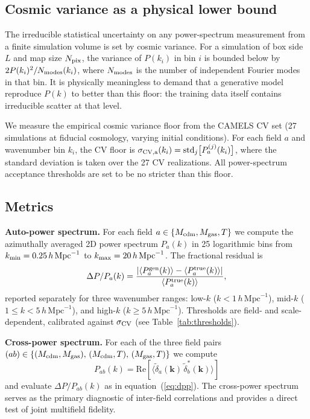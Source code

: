 \documentclass[usenatbib]{mnras}
\newcommand{\Mcdm}{M_{\rm cdm}}
\newcommand{\Mgas}{M_{\rm gas}}
\newcommand{\Tgas}{T}
\newcommand{\DeltaP}{\Delta P/P}
\begin{document}
\subsection{Cosmic variance as a physical lower bound}
\label{sec:cv_floor}

The irreducible statistical uncertainty on any power-spectrum
measurement from a finite simulation volume is set by cosmic variance.
For a simulation of box side $L$ and map size $N_{\rm pix}$, the
variance of $P(k_i)$ in bin $i$ is bounded below by
$2 P(k_i)^2 / N_{\rm modes}(k_i)$, where $N_{\rm modes}$ is the number
of independent Fourier modes in that bin.
It is physically meaningless to demand that a generative model reproduce
$P(k)$ to better than this floor: the training data itself contains
irreducible scatter at that level.

We measure the empirical cosmic variance floor from the CAMELS CV set
(27 simulations at fiducial cosmology, varying initial conditions).
For each field $a$ and wavenumber bin $k_i$, the CV floor is
$\sigma_{\rm CV,a}(k_i) = \mathrm{std}_{j}\bigl[P_a^{(j)}(k_i)\bigr]$,
where the standard deviation is taken over the 27 CV realizations.
All power-spectrum acceptance thresholds are set to be no stricter than
this floor.

\subsection{Metrics}
\label{sec:metrics}

\textbf{Auto-power spectrum.}
For each field $a \in \{\Mcdm, \Mgas, \Tgas\}$ we compute the
azimuthally averaged 2D power spectrum $P_a(k)$ in 25 logarithmic bins
from $k_{\rm min} = 0.25\,h\,\mathrm{Mpc}^{-1}$ to
$k_{\rm max} = 20\,h\,\mathrm{Mpc}^{-1}$.
The fractional residual is
\begin{equation}
  \DeltaP_a(k) =
  \frac{|\langle P_a^{\rm gen}(k)\rangle
       - \langle P_a^{\rm true}(k)\rangle|}
       {\langle P_a^{\rm true}(k)\rangle},
  \label{eq:dpp}
\end{equation}
reported separately for three wavenumber ranges:
low-$k$ ($k < 1\,h\,\mathrm{Mpc}^{-1}$),
mid-$k$ ($1 \leq k < 5\,h\,\mathrm{Mpc}^{-1}$), and
high-$k$ ($k \geq 5\,h\,\mathrm{Mpc}^{-1}$).
Thresholds are field- and scale-dependent, calibrated against
$\sigma_{\rm CV}$ (see Table~\ref{tab:thresholds}).

\textbf{Cross-power spectrum.}
For each of the three field pairs
$(ab) \in \{(\Mcdm,\Mgas),\,(\Mcdm,\Tgas),\,(\Mgas,\Tgas)\}$ we
compute
\begin{equation}
  P_{ab}(k) = \mathrm{Re}\!\left[
    \langle \tilde{\delta}_a(\mathbf{k})\,
            \tilde{\delta}_b^*(\mathbf{k})\rangle
  \right]
  \label{eq:cross}
\end{equation}
and evaluate $\DeltaP_{ab}(k)$ as in equation~(\ref{eq:dpp}).
The cross-power spectrum serves as the primary diagnostic of inter-field
correlations and provides a direct test of joint
multifield fidelity.
\end{document}
